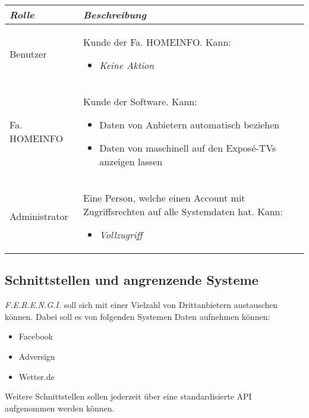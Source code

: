 \documentclass[a4paper]{article}
\begin{document}
	\begin{tabular}{|p{3cm}|p{9cm}|}
	\hline
	\emph{Rolle} & \emph{Beschreibung} \\
	\hline
	Benutzer & Kunde der Fa. HOMEINFO. Kann:
		\begin{itemize}
		\item \emph{Keine Aktion}
		\end{itemize} \\
	\hline
	Fa. HOMEINFO & Kunde der Software. Kann:
		\begin{itemize}
		\item Daten von Anbietern automatisch beziehen
		\item Daten von maschinell auf den Exposé-TVs anzeigen lassen
		\end{itemize} \\
	\hline
	Administrator & Eine Person, welche einen Account mit Zugriffsrechten auf alle Systemdaten hat. Kann:
		\begin{itemize}
		\item \emph{Vollzugriff}
		\end{itemize} \\
	\hline
	\end{tabular}
	
	\pagebreak
		
	\subsection{Schnittstellen und angrenzende Systeme}
	\emph{F.E.R.E.N.G.I.} soll sich mit einer Vielzahl von Drittanbietern austauschen können. Dabei soll es von folgenden Systemen Daten aufnehmen können:
	\begin{itemize}
		\item Facebook
		\item Adversign
		\item Wetter.de
	\end{itemize}
	Weitere Schnittstellen sollen jederzeit über eine standardisierte API aufgenommen werden können.
	
	
\end{document}

